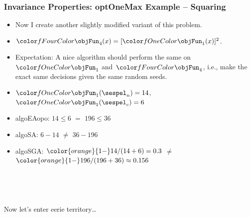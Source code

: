 \documentclass[aspectratio=169,mathserif,notheorems]{beamer}%
\begin{document}
\begin{frame}%
\frametitle{Invariance Properties: \gls{optOneMax} Example -- Squaring}%
\parbox{0.415\paperwidth}{%
\begin{itemize}%
\item Now I create another slightly modified variant of this problem.%
\item<2-> $\fn{4}(x)=[\fn{1}(x)]^2$.%
\item<3-> Expectation: A nice algorithm should perform the same on~$\fn{1}$ and~$\fn{4}$, i.e., make the exact same decisions given the same random seeds.%
%
\item<4-> $\fn{1}(\sespel_n)=14$, $\fn{1}(\sespel_c)=6$%
%
\item<6-> \gls{algoEAopo}: $14\leq6$ \textcolor{greenYesColor}{$\mathbf{=}$} $196\leq36$ \greenYes%
%
\item<7-> \gls{algoSA}: $6-14$ \textcolor{redNoColor}{$\mathbf{\neq}$} $36-196$ \redNo%
%
\item<8-> \gls{algoSGA}: ${\color{orange}{1-}}14/(14+6)=0.3$ \textcolor{redNoColor}{$\mathbf{\neq}$} ${\color{orange}{1-}}196/(196+36)\approx0.156$ \redNo%
\end{itemize}%
}%
%
%
%
%
%
%
%
\end{frame}%
%
\begin{frame}%
\centering%
\strut\\\strut\vfill\strut\\\strut%
{\large{Now let's enter eerie territory\dots}}%
\strut\\\strut\vfill\strut\\\strut%
\end{frame}%
%
\end{document}
